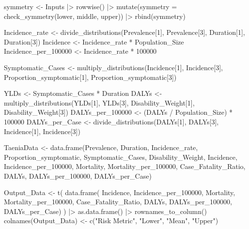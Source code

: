 \documentclass[
  letterpaper,
  DIV=11,
  numbers=noendperiod]{scrartcl}
\newenvironment{Shaded}{\begin{snugshade}}{\end{snugshade}}
\newcommand{\AttributeTok}[1]{\textcolor[rgb]{0.40,0.45,0.13}{#1}}
\newcommand{\DecValTok}[1]{\textcolor[rgb]{0.68,0.00,0.00}{#1}}
\newcommand{\FunctionTok}[1]{\textcolor[rgb]{0.28,0.35,0.67}{#1}}
\newcommand{\NormalTok}[1]{\textcolor[rgb]{0.00,0.23,0.31}{#1}}
\newcommand{\OtherTok}[1]{\textcolor[rgb]{0.00,0.23,0.31}{#1}}
\newcommand{\SpecialCharTok}[1]{\textcolor[rgb]{0.37,0.37,0.37}{#1}}
\newcommand{\StringTok}[1]{\textcolor[rgb]{0.13,0.47,0.30}{#1}}
\begin{document}
\begin{Shaded}
\begin{Highlighting}[]
\NormalTok{symmetry }\OtherTok{\textless{}{-}}\NormalTok{ Inputs }\SpecialCharTok{|\textgreater{}}
 \FunctionTok{rowwise}\NormalTok{() }\SpecialCharTok{|\textgreater{}}
 \FunctionTok{mutate}\NormalTok{(}\AttributeTok{symmetry =} \FunctionTok{check\_symmetry}\NormalTok{(lower,  middle,  upper)) }\SpecialCharTok{|\textgreater{}}
 \FunctionTok{rbind}\NormalTok{(symmetry)}

\NormalTok{Incidence\_rate }\OtherTok{\textless{}{-}} \FunctionTok{divide\_distributions}\NormalTok{(Prevalence[}\DecValTok{1}\NormalTok{], Prevalence[}\DecValTok{3}\NormalTok{],  Duration[}\DecValTok{1}\NormalTok{], Duration[}\DecValTok{3}\NormalTok{])}
\NormalTok{Incidence }\OtherTok{\textless{}{-}}\NormalTok{ Incidence\_rate }\SpecialCharTok{*}\NormalTok{ Population\_Size}
\NormalTok{Incidence\_per\_100000 }\OtherTok{\textless{}{-}}\NormalTok{ Incidence\_rate }\SpecialCharTok{*} \DecValTok{100000}

\NormalTok{Symptomatic\_Cases }\OtherTok{\textless{}{-}} \FunctionTok{multiply\_distributions}\NormalTok{(Incidence[}\DecValTok{1}\NormalTok{], Incidence[}\DecValTok{3}\NormalTok{], Proportion\_symptomatic[}\DecValTok{1}\NormalTok{],  Proportion\_symptomatic[}\DecValTok{3}\NormalTok{])}

\NormalTok{YLDs }\OtherTok{\textless{}{-}}\NormalTok{ Symptomatic\_Cases }\SpecialCharTok{*}\NormalTok{ Duration}
\NormalTok{DALYs }\OtherTok{\textless{}{-}} \FunctionTok{multiply\_distributions}\NormalTok{(YLDs[}\DecValTok{1}\NormalTok{], YLDs[}\DecValTok{3}\NormalTok{], Disability\_Weight[}\DecValTok{1}\NormalTok{],  Disability\_Weight[}\DecValTok{3}\NormalTok{])}
\NormalTok{DALYs\_per\_100000 }\OtherTok{\textless{}{-}}\NormalTok{ (DALYs }\SpecialCharTok{/}\NormalTok{ Population\_Size) }\SpecialCharTok{*} \DecValTok{100000}
\NormalTok{DALYs\_per\_Case }\OtherTok{\textless{}{-}} \FunctionTok{divide\_distributions}\NormalTok{(DALYs[}\DecValTok{1}\NormalTok{], DALYs[}\DecValTok{3}\NormalTok{],  Incidence[}\DecValTok{1}\NormalTok{], Incidence[}\DecValTok{3}\NormalTok{])}

\NormalTok{TaeniaData }\OtherTok{\textless{}{-}} \FunctionTok{data.frame}\NormalTok{(Prevalence,  Duration,  Incidence\_rate,  Proportion\_symptomatic,  Symptomatic\_Cases,  Disability\_Weight,  Incidence,  Incidence\_per\_100000,  Mortality,  Mortality\_per\_100000,  Case\_Fatality\_Ratio,  DALYs,  DALYs\_per\_100000,  DALYs\_per\_Case)}

\NormalTok{Output\_Data }\OtherTok{\textless{}{-}} \FunctionTok{t}\NormalTok{(}
 \FunctionTok{data.frame}\NormalTok{(}
\NormalTok{ Incidence,  Incidence\_per\_100000, }
\NormalTok{ Mortality,  Mortality\_per\_100000, }
\NormalTok{ Case\_Fatality\_Ratio, }
\NormalTok{ DALYs,  DALYs\_per\_100000,  DALYs\_per\_Case)}
\NormalTok{ ) }\SpecialCharTok{|\textgreater{}} 
 \FunctionTok{as.data.frame}\NormalTok{() }\SpecialCharTok{|\textgreater{}} 
 \FunctionTok{rownames\_to\_column}\NormalTok{()}
\FunctionTok{colnames}\NormalTok{(Output\_Data) }\OtherTok{\textless{}{-}} \FunctionTok{c}\NormalTok{(}\StringTok{"Risk Metric"}\NormalTok{,  }\StringTok{"Lower"}\NormalTok{,  }\StringTok{"Mean"}\NormalTok{,  }\StringTok{"Upper"}\NormalTok{)}


\end{Highlighting}
\end{Shaded}
\end{document}
